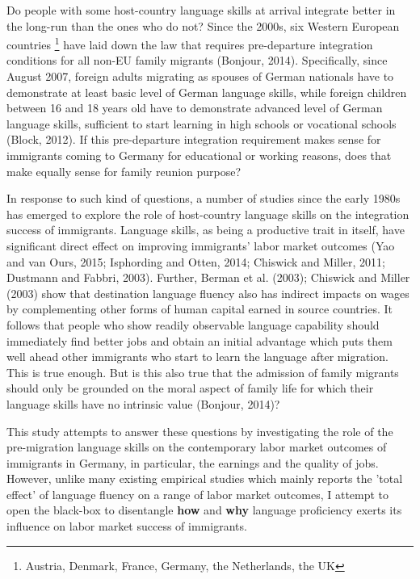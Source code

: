 \documentclass[12pt,a4paper]{article}
\begin{document}
Do people with some host-country language skills at arrival integrate better in the long-run than the ones who do not? Since the 2000s, six Western European countries \footnote{Austria, Denmark, France, Germany, the Netherlands, the UK} have laid down the law that requires pre-departure integration conditions for all non-EU family migrants (Bonjour, 2014). Specifically, since August 2007, foreign adults migrating as spouses of German nationals have to demonstrate at least basic level of German language skills, while foreign children between 16 and 18 years old have to demonstrate advanced level of German language skills, sufficient to start learning in high schools or vocational schools (Block, 2012). If this pre-departure integration requirement makes sense for immigrants coming to Germany for educational or working reasons, does that make equally sense for family reunion purpose? 

In response to such kind of questions, a number of studies since the early 1980s has emerged to explore the role of host-country language skills on the integration success of immigrants. Language skills, as being a productive trait in itself, have significant direct effect on improving immigrants' labor market outcomes (Yao and van Ours, 2015; Isphording and Otten, 2014; Chiswick and Miller, 2011; Dustmann and Fabbri, 2003). Further, Berman et al. (2003); Chiswick and Miller (2003) show that destination language fluency also has indirect impacts on wages by complementing other forms of human capital earned in source countries. It follows that people who show readily observable language capability should immediately find better jobs and obtain an initial advantage which puts them well ahead other immigrants who start to learn the language after migration. This is true enough. But is this also true that the admission of family migrants should only be grounded on the moral aspect of family life for which their language skills have no intrinsic value (Bonjour, 2014)?

This study attempts to answer these questions by investigating the role of the pre-migration language skills on the contemporary labor market outcomes of immigrants in Germany, in particular, the earnings and the quality of jobs. However, unlike many existing empirical studies which mainly reports the 'total effect' of language fluency on a range of labor market outcomes, I attempt to open the black-box to disentangle \textbf{how} and \textbf{why} language proficiency exerts its influence on labor market success of immigrants. 
\end{document}
